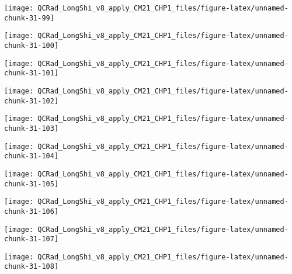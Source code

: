 \documentclass[
  10pt,
  a4paper,oneside]{article}
\begin{document}
\begin{center}\texttt{[image: QCRad\_LongShi\_v8\_apply\_CM21\_CHP1\_files/figure-latex/unnamed-chunk-31-99]} \end{center}

\begin{center}\texttt{[image: QCRad\_LongShi\_v8\_apply\_CM21\_CHP1\_files/figure-latex/unnamed-chunk-31-100]} \end{center}

\begin{center}\texttt{[image: QCRad\_LongShi\_v8\_apply\_CM21\_CHP1\_files/figure-latex/unnamed-chunk-31-101]} \end{center}

\begin{center}\texttt{[image: QCRad\_LongShi\_v8\_apply\_CM21\_CHP1\_files/figure-latex/unnamed-chunk-31-102]} \end{center}

\begin{center}\texttt{[image: QCRad\_LongShi\_v8\_apply\_CM21\_CHP1\_files/figure-latex/unnamed-chunk-31-103]} \end{center}

\begin{center}\texttt{[image: QCRad\_LongShi\_v8\_apply\_CM21\_CHP1\_files/figure-latex/unnamed-chunk-31-104]} \end{center}

\begin{center}\texttt{[image: QCRad\_LongShi\_v8\_apply\_CM21\_CHP1\_files/figure-latex/unnamed-chunk-31-105]} \end{center}

\begin{center}\texttt{[image: QCRad\_LongShi\_v8\_apply\_CM21\_CHP1\_files/figure-latex/unnamed-chunk-31-106]} \end{center}

\begin{center}\texttt{[image: QCRad\_LongShi\_v8\_apply\_CM21\_CHP1\_files/figure-latex/unnamed-chunk-31-107]} \end{center}

\begin{center}\texttt{[image: QCRad\_LongShi\_v8\_apply\_CM21\_CHP1\_files/figure-latex/unnamed-chunk-31-108]} \end{center}
\end{document}
